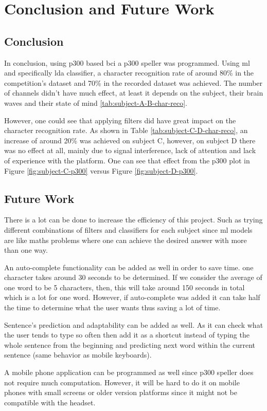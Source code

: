 \chapter{Conclusion and Future Work}
\label{chap:conclusion}
\section{Conclusion}
In conclusion, using \ac{p300} based \ac{bci} a \ac{p300} speller was programmed. Using \ac{ml} and specifically \ac{lda} classifier, a character recognition rate of around 80\% in the competition's dataset and 70\% in the recorded dataset was achieved. The number of channels didn't have much effect, at least it depends on the subject, their brain waves and their state of mind \ref{tab:subject-A-B-char-reco}.\par
However, one could see that applying filters did have great impact on the character recognition rate. As shown in Table \ref{tab:subject-C-D-char-reco}, an increase of around 20\% was achieved on subject C, however, on subject D there was no effect at all, mainly due to signal interference, lack of attention and lack of experience with the platform. One can see that effect from the \ac{p300} plot in Figure \ref{fig:subject-C-p300} versus Figure \ref{fig:subject-D-p300}.\par

\section{Future Work}
There is a lot can be done to increase the efficiency of this project. Such as trying different combinations of filters and classifiers for each subject since \ac{ml} models are like maths problems where one can achieve the desired answer with more than one way.\par
An auto-complete functionality can be added as well in order to save time. one character takes around 30 seconds to be determined. If we consider the average of one word to be 5 characters, then, this will take around 150 seconds in total which is a lot for one word. However, if auto-complete was added it can take half the time to determine what the user wants thus saving a lot of time.\par
Sentence's prediction and adaptability can be added as well. As it can check what the user tends to type so often then add it as a shortcut instead of typing the whole sentence from the beginning and predicting next word within the current sentence (same behavior as mobile keyboards).\par
A mobile phone application can be programmed as well since \ac{p300} speller does not require much computation. However, it will be hard to do it on mobile phones with small screens or older version platforms since it might not be compatible with the headset.

\clearpage
